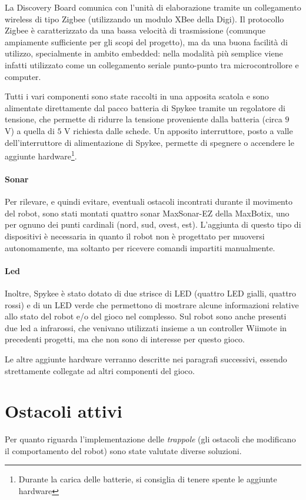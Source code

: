 La Discovery Board comunica con l'unità di elaborazione tramite un collegamento wireless di tipo Zigbee (utilizzando un modulo XBee della Digi\cite{digi}). Il protocollo Zigbee è caratterizzato da una bassa velocità di trasmissione (comunque ampiamente sufficiente per gli scopi del progetto), ma da una buona facilità di utilizzo, specialmente in ambito embedded: nella modalità più semplice viene infatti utilizzato come un collegamento seriale punto-punto tra microcontrollore e computer.

Tutti i vari componenti sono state raccolti in una apposita scatola e sono alimentate direttamente dal pacco batteria di Spykee tramite un regolatore di tensione, che permette di ridurre la tensione proveniente dalla batteria (circa $9$ V) a quella di $5$ V richiesta dalle schede. Un apposito interruttore, posto a valle dell'interruttore di alimentazione di Spykee, permette di spegnere o accendere le aggiunte hardware\footnote{Durante la carica delle batterie, si consiglia di tenere spente le aggiunte hardware}.

\paragraph{Sonar} Per rilevare, e quindi evitare, eventuali ostacoli incontrati durante il movimento del robot, sono stati montati quattro sonar MaxSonar\textregistered-EZ della MaxBotix\cite{maxbotix}, uno per ognuno dei punti cardinali (nord, sud, ovest, est). L'aggiunta di questo tipo di dispositivi è necessaria in quanto il robot non è progettato per muoversi autonomamente, ma soltanto per ricevere comandi impartiti manualmente. 

\paragraph{Led} Inoltre, Spykee è stato dotato di due strisce di LED (quattro LED gialli, quattro rossi) e di un LED verde che permettono di mostrare alcune informazioni relative allo stato del robot e/o del gioco nel complesso. Sul robot sono anche presenti due led a infrarossi, che venivano utilizzati insieme a un controller Wiimote in precedenti progetti, ma che non sono di interesse per questo gioco. 

Le altre aggiunte hardware verranno descritte nei paragrafi successivi, essendo strettamente collegate ad altri componenti del gioco.

\section{Ostacoli attivi}
Per quanto riguarda l'implementazione delle \emph{trappole} (gli ostacoli che modificano il comportamento del robot) sono state valutate diverse soluzioni.


